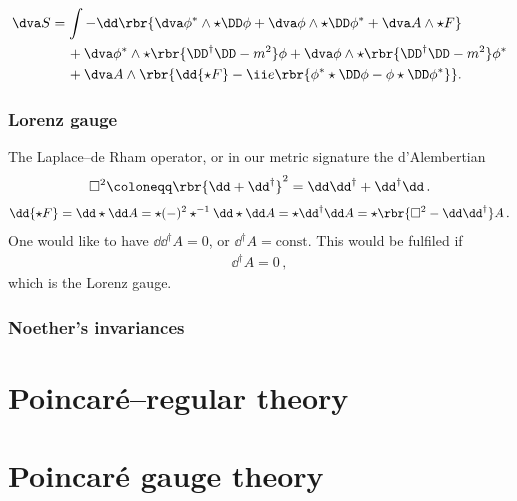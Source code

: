 \documentclass[a4paper]{article}
\begin{document}
\begin{align}
\dva S &=
\int -\dd\rbr{\dva\phi^*\wedge\star\DD\phi +
\dva\phi\wedge\star\DD\phi^* + \dva A \wedge\star F}
\nonumber \\
&\quad\,+
\dva\phi^*\wedge\star\rbr{\DD^{\dagger}\DD-m^2}\phi +
\dva\phi\wedge\star\rbr{\DD^{\dagger}\DD-m^2}\phi^*
\nonumber \\
&\quad\,+
\dva A\wedge\rbr{\dd{\star F} -
	\ii e \rbr{\phi^* \star\DD\phi - \phi \star\DD\phi^*}}.
\end{align}

\subsubsection{Lorenz gauge}
The Laplace--de Rham operator, or in our metric signature the d'Alembertian
\begin{align}
\square^2 \coloneqq \rbr{\dd + \dd^{\dagger}}^2 =
	\dd \dd^{\dagger} + \dd^{\dagger} \dd\,.
\end{align}
\begin{align}
\dd{\star F} = \dd\star \dd A = \star (-)^2 \star^{-1}\dd\star\dd A =
	\star \dd^{\dagger} \dd A = \star\rbr{\square^2 - \dd \dd^{\dagger}} A\,.
\end{align}
One would like to have $\dd \dd^{\dagger} A = 0$, or $\dd^{\dagger} A = 
\text{const}$. This would be fulfiled if
\begin{align}
\dd^{\dagger} A = 0\,,
\end{align}
which is the Lorenz gauge\cite{Lorenz1867,Bladel1991a,Bladel1991b}.

\subsubsection{Noether's invariances}
\cite{Avery2015}


\section{Poincaré--regular theory}




\section{Poincaré gauge theory}
\end{document}
